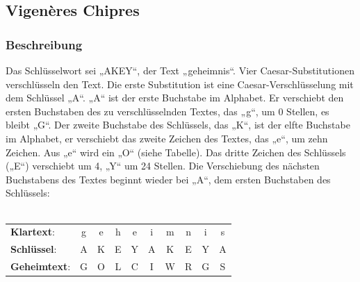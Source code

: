 \documentclass[10pt]{article}
\begin{document}
\subsection{Vigenères Chipres}
\subsubsection{Beschreibung}
Das Schlüsselwort sei „AKEY“, der Text „geheimnis“. Vier Caesar-Substitutionen verschlüsseln den Text. Die erste Substitution ist eine Caesar-Verschlüsselung mit dem Schlüssel „A“. „A“ ist der erste Buchstabe im Alphabet. Er verschiebt den ersten Buchstaben des zu verschlüsselnden Textes, das „g“, um 0 Stellen, es bleibt „G“. Der zweite Buchstabe des Schlüssels, das „K“, ist der elfte Buchstabe im Alphabet, er verschiebt das zweite Zeichen des Textes, das „e“, um zehn Zeichen. Aus „e“ wird ein „O“ (siehe Tabelle). Das dritte Zeichen des Schlüssels („E“) verschiebt um 4, „Y“ um 24 Stellen. Die Verschiebung des nächsten Buchstabens des Textes beginnt wieder bei „A“, dem ersten Buchstaben des Schlüssels: \\ \\
\begin{tabular}{l c c c c c c c c c }
	\textbf{Klartext}: & g & e & h & e & i & m & n & i & s \\
	\textbf{Schlüssel}: & A & K & E & Y & A & K & E & Y & A \\
	\textbf{Geheimtext}: & G & O & L & C & I & W & R & G & S 
\end{tabular}
\end{document}
